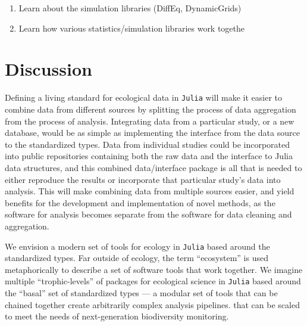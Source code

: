 \documentclass[10pt,oneside]{article}
\begin{document}
\begin{enumerate}
\def\labelenumi{\arabic{enumi}.}
\setcounter{enumi}{7}
\tightlist
\item
  Learn about the simulation libraries (DiffEq, DynamicGrids)
\item
  Learn how various statistics/simulation libraries work togethe
\end{enumerate}

\hypertarget{discussion}{%
\section{Discussion}\label{discussion}}

Defining a living standard for ecological data in \texttt{Julia} will
make it easier to combine data from different sources by splitting the
process of data aggregation from the process of analysis. Integrating
data from a particular study, or a new database, would be as simple as
implementing the interface from the data source to the standardized
types. Data from individual studies could be incorporated into public
repositories containing both the raw data and the interface to Julia
data structures, and this combined data/interface package is all that is
needed to either reproduce the results or incorporate that particular
study's data into analysis. This will make combining data from multiple
sources easier, and yield benefits for the development and
implementation of novel methods, as the software for analysis becomes
separate from the software for data cleaning and aggregation.

We envision a modern set of tools for ecology in \texttt{Julia} based
around the standardized types. Far outside of ecology, the term
``ecosystem'' is used metaphorically to describe a set of software tools
that work together. We imagine multiple ``trophic-levels'' of packages
for ecological science in \texttt{Julia} based around the ``basal'' set
of standardized types --- a modular set of tools that can be chained
together create arbitrarily complex analysis pipelines. that can be
scaled to meet the needs of next-generation biodiversity monitoring.
\end{document}
